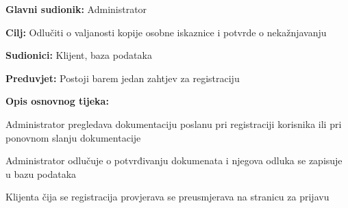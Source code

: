 						\noindent {}
						\begin{packed_item}
							
							\item \textbf{Glavni sudionik: } Administrator
							\item  \textbf{Cilj: } Odlučiti o valjanosti kopije osobne iskaznice i potvrde o nekažnjavanju
							\item  \textbf{Sudionici: }Klijent, baza podataka
							\item  \textbf{Preduvjet: }Postoji barem jedan zahtjev za registraciju 
							\item  \textbf{Opis osnovnog tijeka:}
							
							\item[] \begin{packed_enum}
								
								\item Administrator pregledava dokumentaciju poslanu pri registraciji korisnika ili pri ponovnom slanju dokumentacije 
								\item Administrator odlučuje o potvrđivanju dokumenata i njegova odluka se zapisuje u bazu podataka
								\item Klijenta čija se registracija provjerava se preusmjerava na stranicu za prijavu
								
								
							\end{packed_enum}
						\end{packed_item}
						\noindent {}
